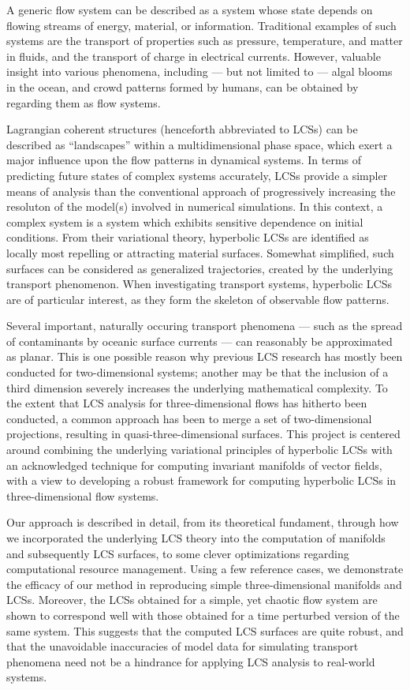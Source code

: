 \begingroup
\vspace{3mm}
A generic flow system can be described as a system whose state depends on
flowing streams of energy, material, or information. Traditional examples of
such systems are the transport of properties such as pressure, temperature, and
matter in fluids, and the transport of charge in electrical currents. However,
valuable insight into various phenomena, including --- but not limited to ---
algal blooms in the ocean, and crowd patterns formed by humans, can be obtained
by regarding them as flow systems.

Lagrangian coherent structures (henceforth abbreviated to LCSs) can be
described as ``landscapes'' within a multidimensional phase space, which exert
a major influence upon the flow patterns in dynamical systems. In terms of
predicting future states of complex systems accurately, LCSs provide a simpler
means of analysis than the conventional approach of progressively increasing
the resoluton of the model(s) involved in numerical simulations. In this
context, a complex system is a system which exhibits sensitive dependence on
initial conditions. From their variational theory, hyperbolic LCSs are
identified as locally most repelling or attracting material surfaces. Somewhat
simplified, such surfaces can be considered as generalized trajectories,
created by the underlying transport phenomenon. When investigating transport
systems, hyperbolic LCSs are of particular interest, as they form the skeleton
of observable flow patterns.

Several important, naturally occuring transport phenomena --- such as the
spread of contaminants by oceanic surface currents --- can reasonably be
approximated as planar. This is one possible reason why previous
LCS research has mostly been conducted for two-dimensional systems; another may
be that the inclusion of a third dimension severely increases the underlying
mathematical complexity. To the extent that LCS analysis for three-dimensional
flows has hitherto been conducted, a common approach has been to merge a set
of two-dimensional projections, resulting in quasi-three-dimensional
surfaces. This project is centered around combining the underlying variational
principles of hyperbolic LCSs with an acknowledged technique for computing
invariant manifolds of vector fields, with a view to developing a robust
framework for computing hyperbolic LCSs in three-dimensional flow systems.

Our approach is described in detail, from its theoretical fundament, through
how we incorporated the underlying LCS theory into the computation of manifolds
and subsequently LCS surfaces, to some clever optimizations regarding
computational resource management. Using a few reference cases, we demonstrate
the efficacy of our method in reproducing simple three-dimensional manifolds
and LCSs. Moreover, the LCSs obtained for a simple, yet chaotic flow
system are shown to correspond well with those obtained for a time perturbed
version of the same system. This suggests that the computed LCS surfaces are
quite robust, and that the unavoidable inaccuracies of model data for
simulating transport phenomena need not be a hindrance for applying LCS
analysis to real-world systems.

